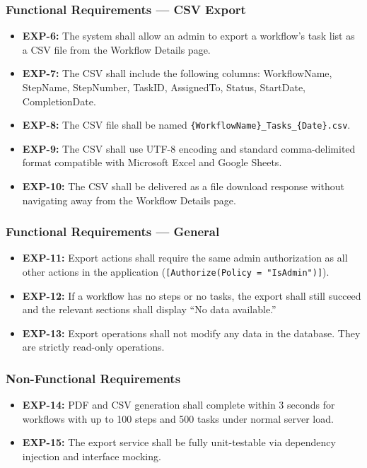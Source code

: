 \documentclass[12pt]{article}
\begin{document}
\subsubsection{Functional Requirements --- CSV Export}
\begin{itemize}
    \item \textbf{EXP-6:} The system shall allow an admin to export a workflow's task list
    as a CSV file from the Workflow Details page.
    \item \textbf{EXP-7:} The CSV shall include the following columns:
    WorkflowName, StepName, StepNumber, TaskID, AssignedTo, Status, StartDate,
    CompletionDate.
    \item \textbf{EXP-8:} The CSV file shall be named
    \texttt{\{WorkflowName\}\_Tasks\_\{Date\}.csv}.
    \item \textbf{EXP-9:} The CSV shall use UTF-8 encoding and standard comma-delimited
    format compatible with Microsoft Excel and Google Sheets.
    \item \textbf{EXP-10:} The CSV shall be delivered as a file download response without
    navigating away from the Workflow Details page.
\end{itemize}

\subsubsection{Functional Requirements --- General}
\begin{itemize}
    \item \textbf{EXP-11:} Export actions shall require the same admin authorization as
    all other actions in the application (\texttt{[Authorize(Policy = "IsAdmin")]}).
    \item \textbf{EXP-12:} If a workflow has no steps or no tasks, the export shall still
    succeed and the relevant sections shall display ``No data available.''
    \item \textbf{EXP-13:} Export operations shall not modify any data in the database.
    They are strictly read-only operations.
\end{itemize}

\subsubsection{Non-Functional Requirements}
\begin{itemize}
    \item \textbf{EXP-14:} PDF and CSV generation shall complete within 3 seconds for
    workflows with up to 100 steps and 500 tasks under normal server load.
    \item \textbf{EXP-15:} The export service shall be fully unit-testable via dependency
    injection and interface mocking.
\end{itemize}
\end{document}
